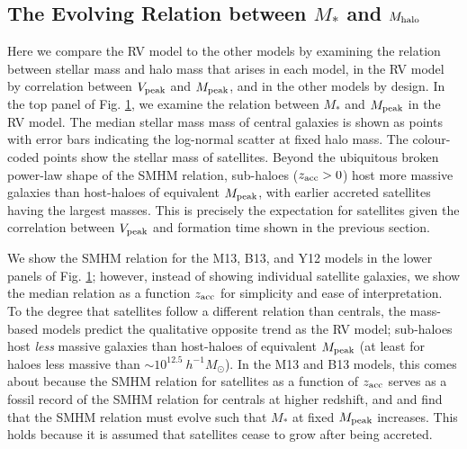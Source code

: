 \documentclass[a4paper,fleqn,usenatbib]{mnras}
\begin{document}
\begin{figure}
    \label{fig:SMHM_comparison}
\end{figure}


\subsection{The Evolving Relation between $M_*$ and $M_{\rm halo}$}
\label{sec:rv_sm_evolv}

Here we compare the RV model to the other models by examining the relation between stellar mass and halo mass that arises in each model, in the RV model by correlation between $V_{\rm peak}$ and $M_{\rm peak}$, and in the other models by design.  In the top panel of Fig. \ref{fig:SMHM_comparison}, we examine the relation between $M_*$ and $M_{\rm peak}$ in the RV model.  The median stellar mass mass of central galaxies is shown as points with error bars indicating the log-normal scatter at fixed halo mass.  The colour-coded points show the stellar mass of satellites.  Beyond the ubiquitous broken power-law shape of the SMHM relation, sub-haloes ($z_{\rm acc}>0$) host more massive galaxies than host-haloes of equivalent $M_{\rm peak}$, with earlier accreted satellites having the largest masses.  This is precisely the expectation for satellites given the correlation between $V_{\rm peak}$ and formation time shown in the previous section.

We show the SMHM relation for the M13, B13, and Y12 models in the lower panels of Fig. \ref{fig:SMHM_comparison}; however, instead of showing individual satellite galaxies, we show the median relation as a function $z_{\rm acc}$ for simplicity and ease of interpretation.  To the degree that satellites follow a different relation than centrals, the mass-based models predict the qualitative opposite trend as the RV model; sub-haloes host {\em less} massive galaxies than host-haloes of equivalent $M_{\rm peak}$ (at least for haloes less massive than $\sim 10^{12.5} ~ h^{-1} M_{\odot}$).  In the M13 and B13 models, this comes about because the SMHM relation for satellites as a function of $z_{\rm acc}$ serves as a fossil record of the SMHM relation for centrals at higher redshift, and \citet{Moster:2013ab} and \citet{Behroozi:2013fg} find that the SMHM relation must evolve such that $M_*$ at fixed $M_{\rm peak}$ increases.  This holds because it is assumed that satellites cease to grow after being accreted. 
\end{document}
